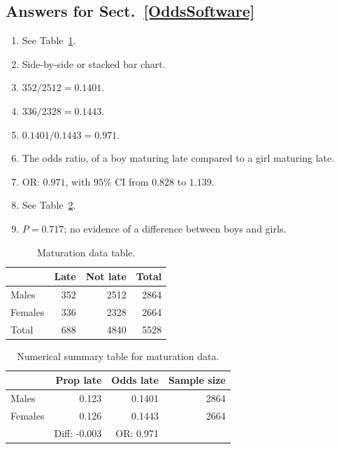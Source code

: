 \documentclass[
  11pt,
  a4paper,
  krantz2]{krantz}
\providecommand{\tightlist}{%
  \setlength{\itemsep}{0pt}\setlength{\parskip}{0pt}}
\begin{document}
\begin{footnotesize}
\subsection*{Answers for Sect.~\ref{OddsSoftware}}\label{answers-for-sect.-refoddssoftware}

\begin{enumerate}
\def\labelenumi{\arabic{enumi}.}
\tightlist
\item
  See Table~\ref{tab:MatTable}.
\item
  Side-by-side or stacked bar chart.
\item
  \(352/2512 = 0.1401\).
\item
  \(336/2328 = 0.1443\).
\item
  \(0.1401/0.1443 = 0.971\).
\item
  The odds ratio, of a boy maturing late compared to a girl maturing late.
\item
  OR: \(0.971\), with \(95\)\% CI from \(0.828\) to \(1.139\).
\item
  See Table~\ref{tab:MatNumSummary}.
\item
  \(P = 0.717\); no evidence of a difference between boys and girls.
\end{enumerate}

\begin{table}
\centering
\caption{\label{tab:MatTable}Maturation data table.}
\centering
\fontsize{8}{10}\selectfont
\begin{tabular}[t]{lrrr}
\toprule
\textbf{ } & \textbf{Late} & \textbf{Not late} & \textbf{Total}\\
\midrule
Males & 352 & 2512 & 2864\\
Females & 336 & 2328 & 2664\\
Total & 688 & 4840 & 5528\\
\bottomrule
\end{tabular}
\end{table}

\begin{table}
\centering
\caption{\label{tab:MatNumSummary}Numerical summary table for maturation data.}
\centering
\fontsize{8}{10}\selectfont
\begin{tabular}[t]{lrrr}
\toprule
\textbf{ } & \textbf{Prop late} & \textbf{Odds late} & \textbf{Sample size}\\
\midrule
Males & 0.123 & 0.1401 & 2864\\
Females & 0.126 & 0.1443 & 2664\\
\midrule
 & Diff: -0.003 & OR: 0.971 & \\
\bottomrule
\end{tabular}
\end{table}


\end{footnotesize}
\end{document}
